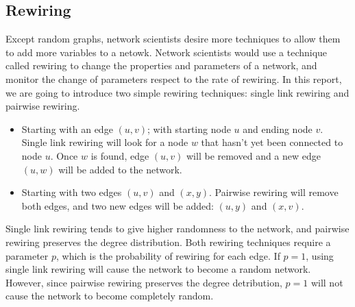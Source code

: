 \documentclass[12pt]{article}
\begin{document}
\subsection{Rewiring}
\label{rewiring}
Except random graphs, network scientists desire more techniques to allow them to add more variables to a netowk. Network scientists would use a technique called rewiring to change the properties and parameters of a network, and monitor the change of parameters respect to the rate of rewiring.\cite{network_rewiring} In this report, we are going to introduce two simple rewiring techniques: single link rewiring and pairwise rewiring.\\
\begin{itemize}
    \item Starting with an edge $(u,v)$; with starting node $u$ and ending node $v$. Single link rewiring will look for a node $w$ that hasn't yet been connected to node $u$. Once $w$ is found, edge $(u,v)$ will be removed and a new edge $(u,w)$ will be added to the network. 
    \item Starting with two edges $(u,v)$ and $(x,y)$. Pairwise rewiring will remove both edges, and two new edges will be added: $(u,y)$ and $(x,v)$.
\end{itemize}
\noindent
Single link rewiring tends to give higher randomness to the network, and pairwise rewiring preserves the degree distribution. Both rewiring techniques require a parameter $p$, which is the probability of rewiring for each edge. If $p=1$, using single link rewiring will cause the network to become a random network. However, since pairwise rewiring preserves the degree detribution, $p=1$ will not cause the network to become completely random.
\end{document}
